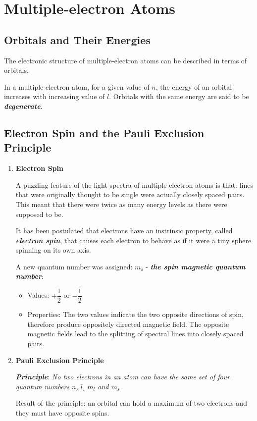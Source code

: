 \documentclass[12pt, a4paper]{report}
\newcommand{\impt}[1]{\textbf{\textit{#1}}}
\newcommand{\hi}{\section}
\newcommand{\hii}{\subsection}
\newcommand{\hiiBEGIN}[1]{\subsection{#1} \begin{enumerate}}
\newcommand{\hiiEND}{\end{enumerate}}
\newcommand{\hiii}{\item\textbf}
\begin{document}
\hi{Multiple-electron Atoms}
    \hii{Orbitals and Their Energies}
        \par The electronic structure of multiple-electron atoms can be described in terms of
        orbitals.
        \par In a multiple-electron atom, for a given value of $n$, the energy of an orbital
        increases with increasing value of $l$. Orbitals with the same energy are said to be
        \impt{degenerate}.

    \hiiBEGIN{Electron Spin and the Pauli Exclusion Principle}
        \hiii{Electron Spin}
            \par A puzzling feature of the light spectra of multiple-electron atoms is that: lines
            that were originally thought to be single were actually closely spaced pairs. This meant
            that there were twice as many energy levels as there were supposed to be.
            \par It has been postulated that electrons have an instrinsic property, called
            \impt{electron spin}, that causes each electron to behave as if it were a tiny sphere
            spinning on its own axis.
            \par A new quantum number was assigned: $m_{s}$ - \impt{the spin magnetic quantum number}:
                \begin{itemize}
                    \item Values: $+\dfrac{1}{2}$ or $-\dfrac{1}{2}$
                    \item Properties: The two values indicate the two opposite directions of spin,
                        therefore produce oppositely directed magnetic field. The opposite magnetic
                        fields lead to the splitting of spectral lines into closely spaced pairs.
                \end{itemize}
        \hiii{Pauli Exclusion Principle}
            \par \impt{Principle}: \textit{No two electrons in an atom can have the same set of four
            quantum numbers $n$, $l$, $m_{l}$ and $m_{s}$.}
            \par Result of the principle: an orbital can hold a maximum of two electrons and they
            must have opposite spins.
    \hiiEND
\end{document}
